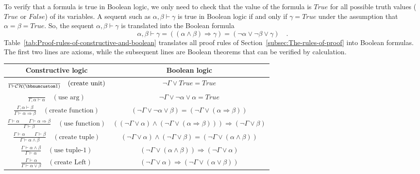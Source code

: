 To verify that a formula is true in Boolean logic, we only need to
check that the value of the formula is $True$ for all possible truth
values ($True$ or $False$) of its variables. A sequent such as $\alpha,\beta\vdash\gamma$
is true in Boolean logic if and only if $\gamma=True$ under the assumption
that $\alpha=\beta=True$. So, the sequent $\alpha,\beta\vdash\gamma$
is translated into the Boolean formula 
\[
\alpha,\beta\vdash\gamma=\left(\left(\alpha\wedge\beta\right)\Rightarrow\gamma\right)=\left(\neg\alpha\vee\neg\beta\vee\gamma\right)\quad.
\]
Table~\ref{tab:Proof-rules-of-constructive-and-boolean} translates
all proof rules of Section~\ref{subsec:The-rules-of-proof} into
Boolean formulas. The first two lines are axioms, while the subsequent
lines are Boolean theorems that can be verified by calculation.

\begin{table}
\begin{centering}
\begin{tabular}{|c|c|}
\hline 
\textbf{\small{}Constructive logic} & \textbf{\small{}Boolean logic}\tabularnewline
\hline 
\hline 
{\small{}$\frac{}{\Gamma\vdash{\cal CH}(\bbnum 1)}\quad(\text{create unit})$} & {\small{}$\neg\Gamma\vee True=True$}\tabularnewline
\hline 
{\small{}$\frac{~}{\Gamma,\alpha\vdash\alpha}\quad(\text{use arg})$} & {\small{}$\neg\Gamma\vee\neg\alpha\vee\alpha=True$}\tabularnewline
\hline 
{\small{}$\frac{\Gamma,\alpha\vdash\beta}{\Gamma\vdash\alpha\Rightarrow\beta}\quad(\text{create function})$} & {\small{}$\left(\neg\Gamma\vee\neg\alpha\vee\beta\right)=\left(\neg\Gamma\vee\left(\alpha\Rightarrow\beta\right)\right)$}\tabularnewline
\hline 
{\small{}$\frac{\Gamma\vdash\alpha\quad\quad\Gamma\vdash\alpha\Rightarrow\beta}{\Gamma\vdash\beta}\quad(\text{use function})$} & {\small{}$\left(\left(\neg\Gamma\vee\alpha\right)\wedge\left(\neg\Gamma\vee\left(\alpha\Rightarrow\beta\right)\right)\right)\Rightarrow\left(\neg\Gamma\vee\beta\right)$}\tabularnewline
\hline 
{\small{}$\frac{\Gamma\vdash\alpha\quad\quad\Gamma\vdash\beta}{\Gamma\vdash\alpha\wedge\beta}\quad(\text{create tuple})$} & {\small{}$\left(\neg\Gamma\vee\alpha\right)\wedge\left(\neg\Gamma\vee\beta\right)=\left(\neg\Gamma\vee\left(\alpha\wedge\beta\right)\right)$}\tabularnewline
\hline 
{\small{}$\frac{\Gamma\vdash\alpha\wedge\beta}{\Gamma\vdash\alpha}\quad(\text{use tuple-}1)$} & {\small{}$\left(\neg\Gamma\vee\left(\alpha\wedge\beta\right)\right)\Rightarrow\left(\neg\Gamma\vee\alpha\right)$}\tabularnewline
\hline 
{\small{}$\frac{\Gamma\vdash\alpha}{\Gamma\vdash\alpha\vee\beta}\quad(\text{create Left})$} & {\small{}$\left(\neg\Gamma\vee\alpha\right)\Rightarrow\left(\neg\Gamma\vee\left(\alpha\vee\beta\right)\right)$}\tabularnewline

\end{tabular}
\end{centering}
\end{table}
